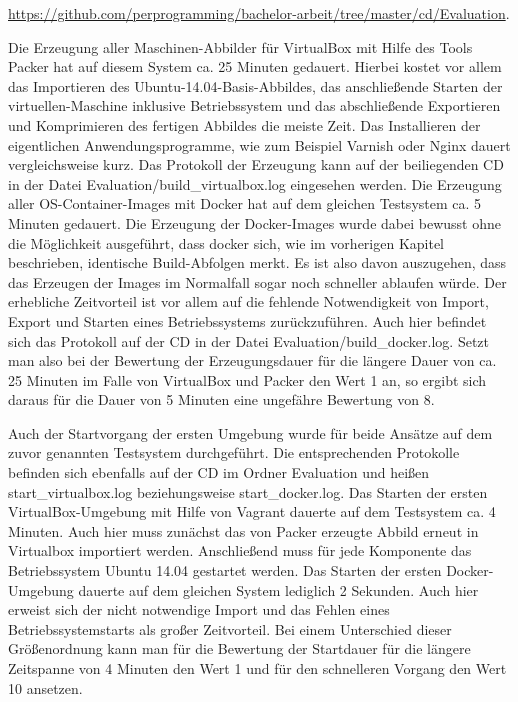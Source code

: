 \href{https://github.com/perprogramming/bachelor-arbeit/tree/master/cd/Evaluation}{https://github.com/perprogramming/bachelor-arbeit/tree/master/cd/Evaluation}.

Die Erzeugung aller Maschinen-Abbilder für VirtualBox mit Hilfe des Tools Packer hat auf diesem System ca. 25 Minuten gedauert. Hierbei kostet vor allem das Importieren des Ubuntu-14.04-Basis-Abbildes, das anschließende Starten der virtuellen-Maschine inklusive Betriebssystem und das abschließende Exportieren und Komprimieren des fertigen Abbildes die meiste Zeit. Das Installieren der eigentlichen Anwendungsprogramme, wie zum Beispiel Varnish oder Nginx dauert vergleichsweise kurz. Das Protokoll der Erzeugung kann auf der beiliegenden CD in der Datei Evaluation/build\_virtualbox.log eingesehen werden. Die Erzeugung aller OS-Container-Images mit Docker hat auf dem gleichen Testsystem ca. 5 Minuten gedauert. Die Erzeugung der Docker-Images wurde dabei bewusst ohne die Möglichkeit ausgeführt, dass docker sich, wie im vorherigen Kapitel beschrieben, identische Build-Abfolgen merkt. Es ist also davon auszugehen, dass das Erzeugen der Images im Normalfall sogar noch schneller ablaufen würde. Der erhebliche Zeitvorteil ist vor allem auf die fehlende Notwendigkeit von Import, Export und Starten eines Betriebssystems zurückzuführen. Auch hier befindet sich das Protokoll auf der CD in der Datei Evaluation/build\_docker.log. Setzt man also bei der Bewertung der Erzeugungsdauer für die längere Dauer von ca. 25 Minuten im Falle von VirtualBox und Packer den Wert 1 an, so ergibt sich daraus für die Dauer von 5 Minuten eine ungefähre Bewertung von 8.

Auch der Startvorgang der ersten Umgebung wurde für beide Ansätze auf dem zuvor genannten Testsystem durchgeführt. Die entsprechenden Protokolle befinden sich ebenfalls auf der CD im Ordner Evaluation und heißen start\_virtualbox.log beziehungsweise start\_docker.log. Das Starten der ersten VirtualBox-Umgebung mit Hilfe von Vagrant dauerte auf dem Testsystem ca. 4 Minuten. Auch hier muss zunächst das von Packer erzeugte Abbild erneut in Virtualbox importiert werden. Anschließend muss für jede Komponente das Betriebssystem Ubuntu 14.04 gestartet werden. Das Starten der ersten Docker-Umgebung dauerte auf dem gleichen System lediglich 2 Sekunden. Auch hier erweist sich der nicht notwendige Import und das Fehlen eines Betriebssystemstarts als großer Zeitvorteil. Bei einem Unterschied dieser Größenordnung kann man für die Bewertung der Startdauer für die längere Zeitspanne von 4 Minuten den Wert 1 und für den schnelleren Vorgang den Wert 10 ansetzen.

